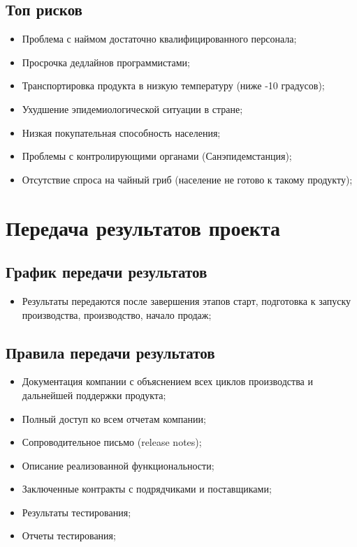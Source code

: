 \documentclass[a4paper,10pt]{article}
\begin{document}
\subsection{Топ рисков}

    \begin{itemize}
        \item Проблема с наймом достаточно квалифицированного персонала;
        \item Просрочка дедлайнов программистами;
        \item Транспортировка продукта в низкую температуру (ниже -10 градусов);
        \item Ухудшение эпидемиологической ситуации в стране;
        \item Низкая покупательная способность населения;
        \item Проблемы с контролирующими органами (Санэпидемстанция);
        \item Отсутствие спроса на чайный гриб (население не готово к такому продукту);
    \end{itemize}


\section{Передача результатов проекта}

\subsection{График передачи результатов}

    \begin{itemize}
        \item Результаты передаются после завершения этапов старт, подготовка к запуску производства, производство, начало продаж;
    \end{itemize}

\subsection{Правила передачи результатов}

    \begin{itemize}
        \item Документация компании с объяснением всех циклов производства и дальнейшей поддержки продукта;
        \item Полный доступ ко всем отчетам компании;
        \item Сопроводительное письмо (release notes);
        \item Описание реализованной функциональности;
        \item Заключенные контракты с подрядчиками и поставщиками;
        \item Результаты тестирования;
        \item Отчеты тестирования;
    \end{itemize}
\end{document}

